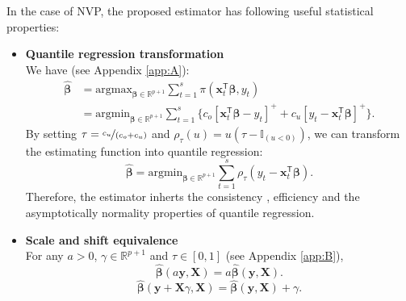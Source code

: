 \documentclass{article}
\begin{document}
In the case of NVP, the proposed estimator has following useful statistical properties:
\begin{itemize}
    \item \textbf{Quantile regression transformation}\\
    We have (see Appendix \ref{app:A}):
    \[
        \begin{aligned}
            \hat{\boldsymbol{\beta}}
            &=\text{argmax}_{\boldsymbol{\beta}\in \mathbb{R}^{p+1}}\displaystyle\sum_{t=1}^s{\pi(\mathbf{x}_t^{\mathsf{T}}\boldsymbol{\beta},y_t)}\\
            &=\text{argmin}_{\boldsymbol{\beta}\in \mathbb{R}^{p+1}}\displaystyle\sum_{t=1}^s{\{c_o[\mathbf{x}_t^{\mathsf{T}}\boldsymbol{\beta}-y_t]^{+}+c_u[y_t-\mathbf{x}_t^{\mathsf{T}}\boldsymbol{\beta}]^{+}\}}.
        \end{aligned}
    \]
    By setting $\tau=\nicefrac{c_u}{(c_o+c_u)}$ and $\displaystyle \rho_{\tau}(u)=u(\tau-\mathbb{I}_{(u<0)})$, we can transform the estimating function into quantile regression:
    \[
         \hat{\boldsymbol{\beta}}=\text{argmin}_{\boldsymbol{\beta}\in \mathbb{R}^{p+1}}\displaystyle\sum_{t=1}^s\rho_{\tau}(y_t-\mathbf{x}_t^{\mathsf{T}}\boldsymbol{\beta}).
    \]
    Therefore, the estimator inherts the consistency \cite{Koe05}, efficiency \cite{KM99} and the asymptotically normality properties \cite{KHM05} of quantile regression.
    
    \item \textbf{Scale and shift equivalence}\\
    For any $a>0$, $\gamma\in \mathbb{R}^{p+1}$ and $\tau\in[0,1]$ (see Appendix \ref{app:B}),
    \[
        \hat{\boldsymbol{\beta}}(a\mathbf{y},\mathbf{X})=a\hat{\boldsymbol{\beta}}(\mathbf{y},\mathbf{X}).
    \]
    \[
        \hat{\boldsymbol{\beta}}(\mathbf{y}+\mathbf{X}\gamma,\mathbf{X})=\hat{\boldsymbol{\beta}}(\mathbf{y},\mathbf{X})+\gamma.
    \]
    

\end{itemize}
\end{document}
